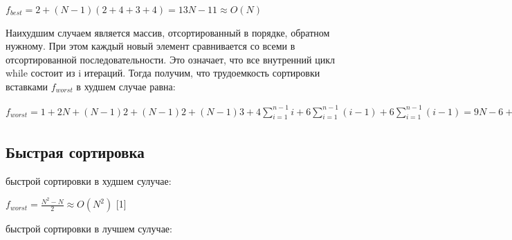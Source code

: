 \documentclass[a4paper,14pt]{report}
\begin{document}
$f_{best} = 2 + (N - 1)(2 + 4 + 3 + 4) = 13N - 11 \approx O(N)$

Наихудшим случаем является массив, отсортированный в порядке, обратном нужному. При этом каждый новый элемент сравнивается со всеми в отсортированной последовательности. Это означает, что все внутренний цикл while состоит из i итераций. Тогда получим, что трудоемкость сортировки вставками $f_{worst}$ в худшем случае равна:

$f_{worst} = 1 + 2N + (N - 1)2 + (N - 1)2 + (N - 1)3 + 4 \sum\limits_{i=1}^{n-1}i + 6 \sum\limits_{i=1}^{n-1}(i - 1) + 6 \sum\limits_{i=1}^{n-1}(i - 1) = 9N - 6 + 4 \frac{N(N - 1)}{2} + 12 (\frac{N(N - 1)}{2} - 1) \approx \frac{N^2}{2} \approx O(N^2)$



\subsection*{Быстрая сортировка}

 быстрой сортировки в худшем сулучае:

$f_{worst} = \frac{N^2 - N}{2} \approx O(N^2)$ [1]



 быстрой сортировки в лучшем сулучае:
\end{document}
